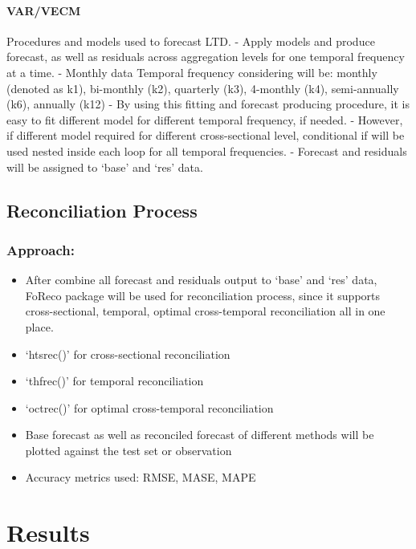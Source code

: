 \documentclass[11pt,a4paper,]{article}
\providecommand{\tightlist}{%
  \setlength{\itemsep}{0pt}\setlength{\parskip}{0pt}}
\begin{document}
\paragraph{VAR/VECM}\label{varvecm}

Procedures and models used to forecast LTD.
- Apply models and produce forecast, as well as residuals across aggregation levels for one temporal frequency at a time.
- Monthly data Temporal frequency considering will be: monthly (denoted as k1), bi-monthly (k2), quarterly (k3), 4-monthly (k4), semi-annually (k6), annually (k12)
- By using this fitting and forecast producing procedure, it is easy to fit different model for different temporal frequency, if needed.
- However, if different model required for different cross-sectional level, conditional if will be used nested inside each loop for all temporal frequencies.
- Forecast and residuals will be assigned to `base' and `res' data.

\subsection{Reconciliation Process}\label{reconciliation-process}

\subsubsection{Approach:}\label{approach}

\begin{itemize}
\tightlist
\item
  After combine all forecast and residuals output to `base' and `res' data, FoReco package will be used for reconciliation process, since it supports cross-sectional, temporal, optimal cross-temporal reconciliation all in one place.
\item
  `htsrec()' for cross-sectional reconciliation
\item
  `thfrec()' for temporal reconciliation
\item
  `octrec()' for optimal cross-temporal reconciliation
\item
  Base forecast as well as reconciled forecast of different methods will be plotted against the test set or observation
\item
  Accuracy metrics used: RMSE, MASE, MAPE
\end{itemize}

\section{Results}\label{results}
\end{document}
